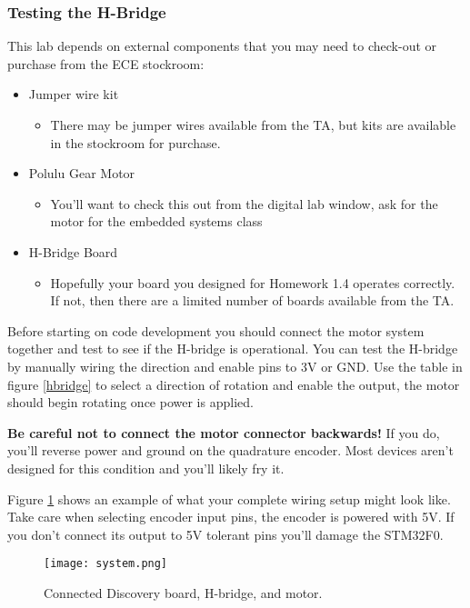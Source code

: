 \documentclass[11pt,fleqn]{book} %
\begin{document}
\subsubsection{Testing the H-Bridge}
This lab depends on external components that you may need to check-out or purchase from the ECE stockroom:
\begin{itemize}
    \item Jumper wire kit
    \begin{itemize}
        \item There may be jumper wires available from the TA, but kits are available in the stockroom for purchase.
    \end{itemize}
    \item Polulu Gear Motor 
    \begin{itemize}
        \item You'll want to check this out from the digital lab window, ask for the motor for the embedded systems class
    \end{itemize}
    \item H-Bridge Board
    \begin{itemize}
        \item Hopefully your board you designed for Homework 1.4 operates correctly. If not, then there are a limited number of boards available from the TA.
    \end{itemize}
\end{itemize}
Before starting on code development you should connect the motor system together and test to see if the H-bridge is operational. You can test the H-bridge by manually wiring the direction and enable pins to 3V or GND. Use the table in figure \ref{hbridge} to select a direction of rotation and enable the output, the motor should begin rotating once power is applied. 

\begin{warning}
    \textbf{Be careful not to connect the motor connector backwards!} If you do, you'll reverse power and ground on the quadrature encoder. Most devices aren't designed for this condition and you'll likely fry it.
\end{warning}
Figure \ref{system} shows an example of what your complete wiring setup might look like. Take care when selecting encoder input pins, the encoder is powered with 5V. If you don't connect its output to 5V tolerant pins you'll damage the STM32F0.

\begin{figure}[tb]
    \centering\texttt{[image: system.png]}
    \caption{Connected Discovery board, H-bridge, and motor.}
    \label{system}
\end{figure}
\end{document}
